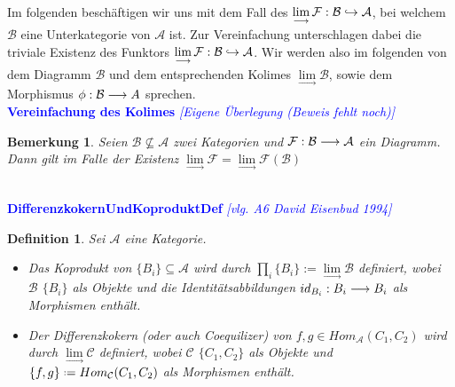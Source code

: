 \documentclass[10pt,a4paper]{report}
\newcommand{\ModulsOfDifferenzials}{David Eisenbud 1994}
\newcounter{Aussage}[chapter]
\newtheorem{bem}[Aussage]{Bemerkung}
\newtheorem{definition}[Aussage]{Definition}
\newcommand{\functionfront}[3]{\nolinebreak{#1:#2 \longrightarrow #3}}
\newcommand{\infunctionfront}[3]{\nolinebreak{#1:#2 \hookrightarrow #3}}
\newcommand{\colimes}[0]{\lim\limits_{ \longrightarrow }}
\newcommand*{\defeq}{\mathrel{\vcenter{\baselineskip0.5ex \lineskiplimit0pt
                     \hbox{\scriptsize.}\hbox{\scriptsize.}}}%
                     =}
\begin{document}
\ \\
Im folgenden beschäftigen wir uns mit dem Fall des $\colimes \infunctionfront{\mathcal{F}}{\mathcal{B}}{\mathcal{A}}$, bei welchem $\mathcal{B}$ eine Unterkategorie von $\mathcal{A}$ ist. Zur Vereinfachung unterschlagen dabei die triviale Existenz des Funktors $\colimes \infunctionfront{\mathcal{F}}{\mathcal{B}}{\mathcal{A}}$. Wir werden also im folgenden von dem Diagramm $\mathcal{B}$ und dem entsprechenden Kolimes $\colimes \mathcal{B}$, sowie dem Morphismus $\functionfront{\phi}{\mathcal{B}}{A} $ sprechen.\\ 
\textcolor{blue}{\textbf{Vereinfachung des Kolimes} \textit{[Eigene Überlegung (Beweis fehlt noch)]}}
\begin{bem}\label{Vereinfachung des Kolimes}
Seien $\mathcal{B} \nsubseteq \mathcal{A}$ zwei Kategorien und $\functionfront{\mathcal{F}}{\mathcal{B}}{\mathcal{A}}$ ein Diagramm.\\
Dann gilt im Falle der Existenz $\colimes \mathcal{F} = \colimes \mathcal{F}(\mathcal{B})$ 
\end{bem}


\ \\
\textcolor{blue}{\textbf{DifferenzkokernUndKoproduktDef} \textit{[vlg. A6 \ModulsOfDifferenzials]}}
\begin{definition} \label{DifferenzkokernUndKoproduktDef}
Sei $\mathcal{A}$ eine Kategorie.
\begin{itemize}
\item Das Koprodukt von $ \lbrace B_i \rbrace \subseteq \mathcal{A}$ wird durch $\prod_i \lbrace B_i \rbrace := \colimes\mathcal{B}$ definiert, 
wobei $\mathcal{B}$ $\lbrace B_i \rbrace$ als Objekte und die Identitätsabbildungen $\functionfront{id_{B_i}}{B_i}{B_i}$ als Morphismen enthält.
\item Der Differenzkokern (oder auch Coequilizer) von $f,g \in Hom_{\mathcal{A}}(C_1,C_2)$ wird durch $\colimes \mathcal{C}$ definiert,
wobei $\mathcal{C}$ $\lbrace C_1,C_2 \rbrace$ als Objekte und $ \lbrace f,g \rbrace \defeq Hom_{\mathcal{C}}(C_1,C_2)$ als Morphismen enthält.
\end{itemize}
\end{definition}
\end{document}
